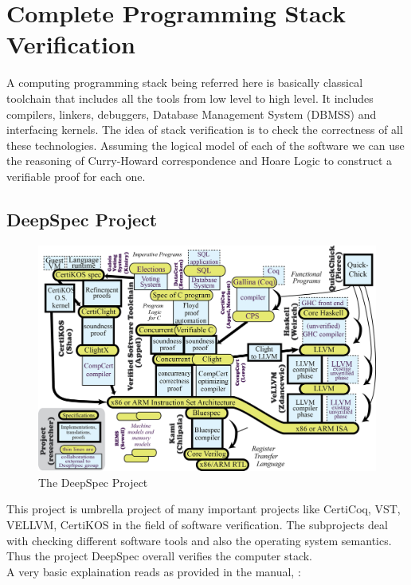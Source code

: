 \chapter{Complete Programming Stack Verification}
\graphicspath{ {./images/}} 

A computing programming stack being referred here is basically classical toolchain that includes all the tools from low level to high level. It includes compilers, linkers, debuggers, Database Management System (DBMSS) and interfacing kernels. The idea of stack verification is to check the correctness of all these technologies. Assuming the logical model of each of the software we can use the reasoning of Curry-Howard correspondence and Hoare Logic to construct a verifiable proof for each one.\\

\section{DeepSpec Project}


\begin{figure}[!htb]
\centering
  \includegraphics[scale=0.7]{deepspec}
  \caption{The DeepSpec Project}
\end{figure}

This project is umbrella project of many important projects like CertiCoq, VST, VELLVM, CertiKOS in the field of software verification. The subprojects deal with checking different software tools and also the operating system semantics. Thus the project DeepSpec overall verifies the computer stack. \\

A very basic explaination reads as provided in the manual, :

